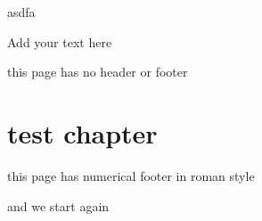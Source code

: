 \documentclass[12pt]{report}
\begin{document}
asdfa

Add your text here 

\pagebreak 
\thispagestyle{empty}

this page has no header or footer 

\pagebreak 
\chapter{test chapter}
this page has numerical footer in roman style 

\pagebreak 
and we start again 
\end{document}
